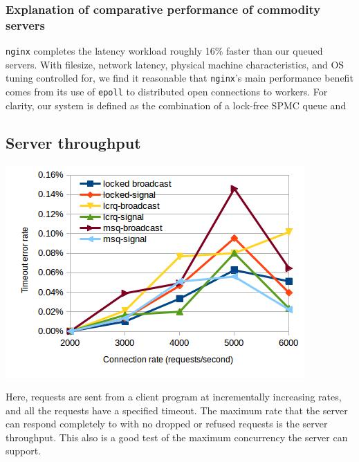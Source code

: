 \documentclass[twoside,10pt]{article}
\newenvironment{Figure}
  {\par\medskip\noindent\minipage{\linewidth}}
  {\endminipage\par\medskip}
\begin{document}
\begin{multicols}{2}
\subsubsection{Explanation of comparative performance of commodity
  servers}

\verb+nginx+ completes the latency workload roughly 16\% faster than
our queued servers. With filesize, network latency, physical machine
characteristics, and OS tuning controlled for, we find it reasonable
that \verb+nginx+'s main performance benefit comes from its use of
\verb+epoll+ to distributed open connections to workers. For clarity,
our system is defined as the combination of a lock-free SPMC queue and


\subsection{Server throughput}

\begin{Figure}
\includegraphics[width=\linewidth]{img/throughputmedian.png}
\end{Figure}

Here, requests are sent from a client program at incrementally
increasing rates, and all the requests have a specified
timeout. The maximum rate that the server can respond completely to
with no dropped or refused requests is the server throughput. This
also is a good test of the maximum concurrency the server can support.


\end{multicols}
\end{document}
